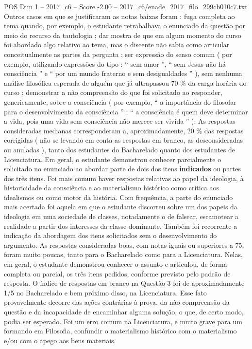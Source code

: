 \begin{textsample}{POS Dim 1 – 2017\_c6 – Score -2.00 – 2017\_c6/enade\_2017\_filo\_299cb010c7.txt}
Outros casos em que se justificaram as notas baixas foram : fuga completa ao tema quando, por exemplo, o estudante retrabalhava o enunciado da questão por meio do recurso da tautologia ; dar mostra de que em algum momento do curso foi abordado algo relativo ao tema, mas o discente não sabia como articular conceitualmente as partes da pergunta ; ser expressão do senso comum ( por exemplo, utilizando expressões do tipo : “ sem amor ”, “ sem Jesus não há consciência ” e “ por um mundo fraterno e sem desigualdades ” ), sem nenhuma análise filosófica esperada de alguém que já ultrapassou 70 \% da carga horária do curso ; demonstrar a não compreensão do que foi solicitado ao responder, genericamente, sobre a consciência ( por exemplo, “ a importância do filosofar para o desenvolvimento da consciência ” ; “ a consciência é quem deve determinar a vida, pois uma vida sem consciência não merece ser vivida ” ).
As respostas consideradas medianas corresponderam a, aproximadamente, 20 \% das respostas corrigidas ( não se levando em conta as respostas em branco, as desconsideradas ou anuladas ), tanto dos estudantes do Bacharelado quanto dos estudantes de Licenciatura.
Em geral, o estudante demonstrou conhecer parcialmente o solicitado no enunciado ao abordar parte de dois dos itens \textbf{indicados} ou partes dos três itens.
Foi mais comum haver respostas relativas ao papel da ideologia, à historicidade da consciência e ao materialismo histórico como crítica aos idealismos ou como motor da história.
Com frequência, a parte do enunciado mais acertada foi aquela em que o estudante discorreu sobre um dos papeis da ideologia em uma sociedade de classes, notadamente o de falsear, escamotear a realidade a partir dos interesses da classe dominante.
Também foi recorrente a indicação da abordagem dos itens solicitados sem o desenvolvimento do argumento.
As respostas consideradas boas, com notas iguais ou superiores a 75, foram muito poucas, tanto para o Bacharelado como para a Licenciatura.
Nelas, em geral, o estudante demonstrou conhecer o assunto e articulou, de forma completa ou parcial, os três itens pedidos, conforme previsto pelo padrão de resposta.
O índice de respostas em branco na Questão 3 foi de aproximadamente 1/5 no Bacharelado e bem próximo disso, na Licenciatura.
Esse fato provavelmente decorre das ações contrárias à prova, da não compreensão da questão e da incapacidade de encaminhar alguma solução, o que, de certo modo, podia ser esperado.
Foi um erro comum na Licenciatura, e muito grave para um formando em Filosofia, confundir o materialismo histórico com o materialismo e/ou com o apego aos bens materiais.

\end{textsample}

